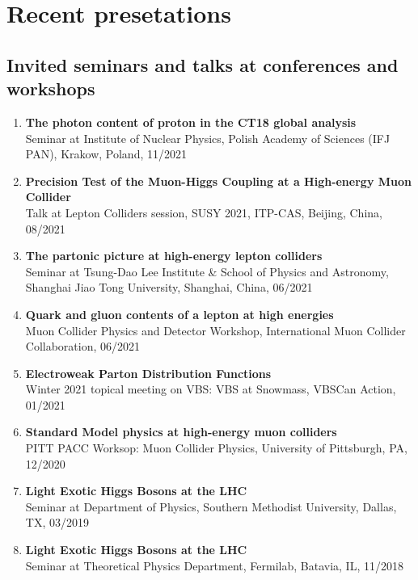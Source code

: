 \documentclass[12pt]{article}
\begin{document}


\section*{Recent presetations}
\subsection*{Invited seminars and talks at conferences and workshops}
\begin{enumerate}
\item \textbf{The photon content of proton in the CT18 global analysis}\\
Seminar at Institute of Nuclear Physics, Polish Academy of Sciences (IFJ PAN), Krakow, Poland, 11/2021
\item \textbf{Precision Test of the Muon-Higgs Coupling at a High-energy Muon Collider}\\
Talk at Lepton Colliders session, SUSY 2021, ITP-CAS, Beijing, China, 08/2021
\item \textbf{The partonic picture at high-energy lepton colliders}\\
Seminar at Tsung-Dao Lee Institute \& School of Physics and Astronomy,
Shanghai Jiao Tong University, Shanghai, China, 06/2021
\item \textbf{Quark and gluon contents of a lepton at high energies}\\
Muon Collider Physics and Detector Workshop, International Muon Collider Collaboration, 06/2021
\item \textbf{Electroweak Parton Distribution Functions}\\
Winter 2021 topical meeting on VBS: VBS at Snowmass, VBSCan Action, 01/2021
\item \textbf{Standard Model physics at high-energy muon colliders}\\
PITT PACC Worksop: Muon Collider Physics, University of Pittsburgh, PA, 12/2020
\item \textbf{Light Exotic Higgs Bosons at the LHC}\\
Seminar at Department of Physics, Southern Methodist University, Dallas, TX, 03/2019
\item \textbf{Light Exotic Higgs Bosons at the LHC}\\
Seminar at Theoretical Physics Department, Fermilab, Batavia, IL, 11/2018
\end{enumerate}
\end{document}
